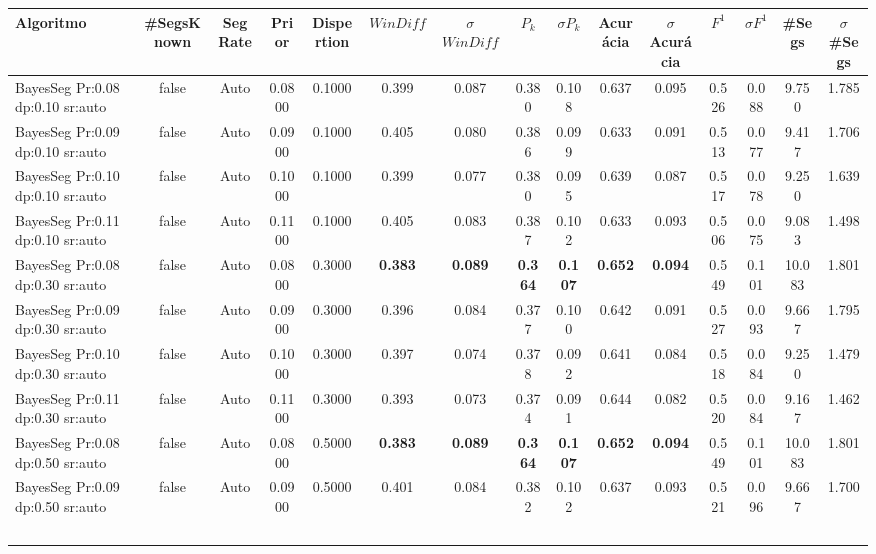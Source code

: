 \documentclass{article}
\begin{document}
\tiny\begin{longtable}[c]{|l|c|c|c|c|c|c|c|c|c|c|c|c|c|c|} 
\hline 
Algoritmo & \#SegsKnown & Seg Rate & Prior & Dispertion & $WinDiff$ & $\sigma$$WinDiff$ & $P_k$ & $\sigma$$P_k$ & Acurácia & $\sigma$Acurácia & $F^1$ & $\sigma$$F^1$ & \#Segs & $\sigma$\#Segs\\ \hline 
BayesSeg Pr:0.08 dp:0.10 sr:auto & false & Auto & 0.0800 & 0.1000 & 0.399 & 0.087 & 0.380 & 0.108 & 0.637 & 0.095 & 0.526 & 0.088 & 9.750 & 1.785  \\ \hline 
 BayesSeg Pr:0.09 dp:0.10 sr:auto & false & Auto & 0.0900 & 0.1000 & 0.405 & 0.080 & 0.386 & 0.099 & 0.633 & 0.091 & 0.513 & 0.077 & 9.417 & 1.706  \\ \hline 
 BayesSeg Pr:0.10 dp:0.10 sr:auto & false & Auto & 0.1000 & 0.1000 & 0.399 & 0.077 & 0.380 & 0.095 & 0.639 & 0.087 & 0.517 & 0.078 & 9.250 & 1.639  \\ \hline 
 BayesSeg Pr:0.11 dp:0.10 sr:auto & false & Auto & 0.1100 & 0.1000 & 0.405 & 0.083 & 0.387 & 0.102 & 0.633 & 0.093 & 0.506 & 0.075 & 9.083 & 1.498  \\ \hline 
 BayesSeg Pr:0.08 dp:0.30 sr:auto & false & Auto & 0.0800 & 0.3000 & \cellcolor{gray!20} \textbf{0.383} & \cellcolor{gray!20} \textbf{0.089} & \cellcolor{gray!20} \textbf{0.364} & \cellcolor{gray!20} \textbf{0.107} & \cellcolor{gray!20} \textbf{0.652} & \cellcolor{gray!20} \textbf{0.094} & 0.549 & 0.101 & 10.083 & 1.801  \\ \hline 
 BayesSeg Pr:0.09 dp:0.30 sr:auto & false & Auto & 0.0900 & 0.3000 & 0.396 & 0.084 & 0.377 & 0.100 & 0.642 & 0.091 & 0.527 & 0.093 & 9.667 & 1.795  \\ \hline 
 BayesSeg Pr:0.10 dp:0.30 sr:auto & false & Auto & 0.1000 & 0.3000 & 0.397 & 0.074 & 0.378 & 0.092 & 0.641 & 0.084 & 0.518 & 0.084 & 9.250 & 1.479  \\ \hline 
 BayesSeg Pr:0.11 dp:0.30 sr:auto & false & Auto & 0.1100 & 0.3000 & 0.393 & 0.073 & 0.374 & 0.091 & 0.644 & 0.082 & 0.520 & 0.084 & 9.167 & 1.462  \\ \hline 
 BayesSeg Pr:0.08 dp:0.50 sr:auto & false & Auto & 0.0800 & 0.5000 & \cellcolor{gray!20} \textbf{0.383} & \cellcolor{gray!20} \textbf{0.089} & \cellcolor{gray!20} \textbf{0.364} & \cellcolor{gray!20} \textbf{0.107} & \cellcolor{gray!20} \textbf{0.652} & \cellcolor{gray!20} \textbf{0.094} & 0.549 & 0.101 & 10.083 & 1.801  \\ \hline 
 BayesSeg Pr:0.09 dp:0.50 sr:auto & false & Auto & 0.0900 & 0.5000 & 0.401 & 0.084 & 0.382 & 0.102 & 0.637 & 0.093 & 0.521 & 0.096 & 9.667 & 1.700  \\ \hline 
$$
\end{longtable}
\end{document}
